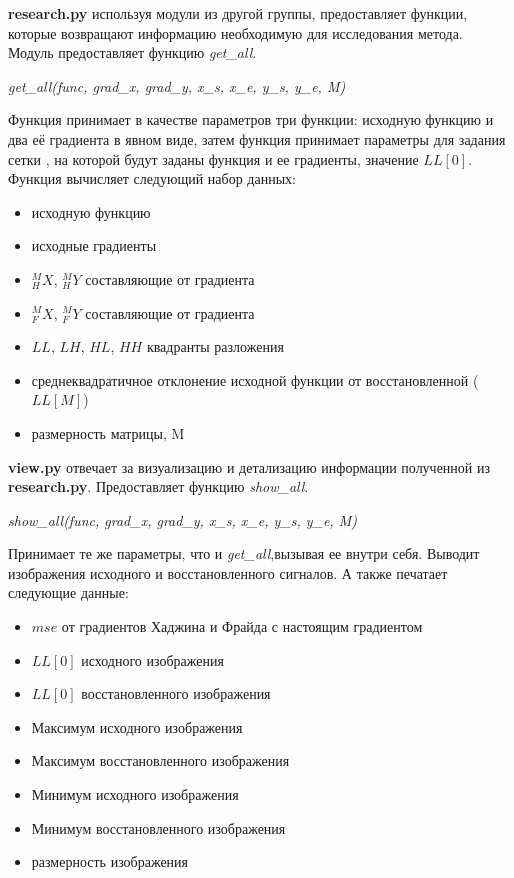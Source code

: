 \documentclass[oneside, final, 14pt]{article}
\begin{document}
\textbf{research.py} используя модули из другой группы, предоставляет функции, которые возвращают информацию необходимую для исследования метода. Модуль предоставляет функцию \textit{get\_all}.

\textit{get\_all(func, grad\_x, grad\_y, x\_s, x\_e, y\_s, y\_e, M)}

Функция принимает в качестве параметров три функции: исходную функцию и два её градиента в явном виде, затем функция принимает параметры для задания сетки , на которой будут заданы функция и ее градиенты, значение $LL[0]$. Функция вычисляет следующий набор данных:
\begin{itemize}
\item исходную функцию
\item исходные градиенты
\item $_H^MX$, $_H^MY$ составляющие от градиента
\item $_F^MX$, $_F^MY$ составляющие от градиента
\item $LL$, $LH$, $HL$, $HH$ квадранты разложения
\item среднеквадратичное отклонение исходной функции от восстановленной ($LL[M]$)
\item размерность матрицы, M
\end{itemize}

\textbf{view.py} отвечает за визуализацию и детализацию информации полученной из \textbf{research.py}. Предоставляет функцию \textit{show\_all}.

\textit{show\_all(func, grad\_x, grad\_y, x\_s, x\_e, y\_s, y\_e, M)}

Принимает те же параметры, что и \textit{get\_all},вызывая ее внутри себя. Выводит изображения исходного и восстановленного сигналов. А также печатает следующие данные:
\begin{itemize}
\item $mse$ от градиентов Хаджина и Фрайда с настоящим градиентом
\item $LL[0]$ исходного изображения 
\item $LL[0]$ восстановленного изображения
\item Максимум исходного изображения
\item Максимум восстановленного изображения
\item Минимум исходного изображения 
\item Минимум восстановленного изображения 
\item размерность изображения
\end{itemize}
\end{document}
